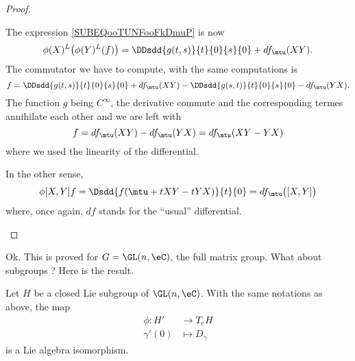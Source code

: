 \begin{proof}
\begin{subproof}
		The expression \eqref{SUBEQooTUNFooFkDmuP} is now
		\begin{equation}
			\phi(X)^L\big( \phi(Y)^L(f) \big)=\DDsdd{ g(t,s) }{t}{0}{s}{0}+df_{\mtu}(XY).
		\end{equation}
		The commutator we have to compute, with the same computations is
		\begin{equation}
			[\phi(X),\phi(Y)]f=\DDsdd{ g(t,s) }{t}{0}{s}{0}+df_{\mtu}(XY)-\DDsdd{ g(s,t) }{t}{0}{s}{0}-df_{\mtu}(YX).
		\end{equation}
		The function \( g\) being \(  C^{\infty}\), the derivative commute and the corresponding termes annihilate each other and we are left with
		\begin{equation}
			[\phi(X),\phi(Y)]f=df_{\mtu}(XY)-df_{\mtu}(YX)=df_{\mtu}(XY-YX)
		\end{equation}
		where we used the linearity of the differential.

		In the other sense,
		\begin{equation}
			\phi[X,Y]f=\Dsdd{ f(\mtu+tXY-tYX) }{t}{0}=df_{\mtu}\big( [X,Y] \big)
		\end{equation}
		where, once again, \( df\) stands for the ``usual'' differential.
	\end{subproof}
\end{proof}

Ok. This is proved for \( G=\GL(n,\eC)\), the full matrix group. What about subgroups ? Here is the result.

\begin{proposition}      \label{PROPooSQHLooGQAykc}
	Let \( H\) be a closed Lie subgroup of \( \GL(n,\eC)\). With the same notations as above, the map
	\begin{equation}
		\begin{aligned}
			\phi\colon H' & \to T_eH           \\
			\gamma'(0)    & \mapsto D_{\gamma}
		\end{aligned}
	\end{equation}
	is a Lie algebra isomorphism.
\end{proposition}

